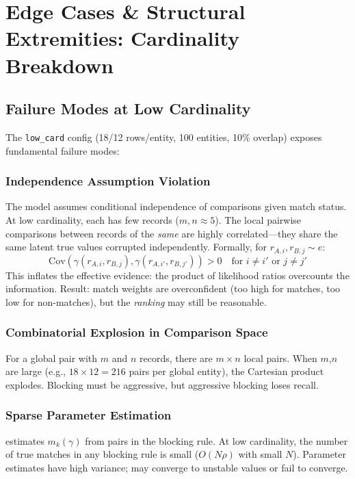\section{Edge Cases \& Structural Extremities: Cardinality Breakdown}
\label{sec:edge_cases}

\subsection{Failure Modes at Low Cardinality}
\label{sec:low_card_failure}

The \texttt{low\_card} config (18/12 rows/entity, 100 entities, 10\% overlap) exposes fundamental failure modes:

\subsubsection{Independence Assumption Violation}
The \fellegisunter{} model assumes conditional independence of comparisons given match status.
At low cardinality, each \globalentity{} has few records ($m,n \approx 5$).
The local pairwise comparisons between records of the \textit{same} \globalentity{} are highly correlated—they share the same latent true values corrupted independently.
Formally, for $r_{A,i}, r_{B,j} \sim e$:
\begin{equation}
	\text{Cov}(\gamma(r_{A,i}, r_{B,j}), \gamma(r_{A,i'}, r_{B,j'})) > 0 \quad \text{for } i \neq i' \text{ or } j \neq j'
\end{equation}
This inflates the effective evidence: the product of likelihood ratios overcounts the information.
Result: match weights are overconfident (too high for matches, too low for non-matches), but the \textit{ranking} may still be reasonable.

\subsubsection{Combinatorial Explosion in Comparison Space}
For a global pair with $m$ and $n$ records, there are $m \times n$ local pairs.
When $m$,$n$ are large (e.g., $18 \times 12 = 216$ pairs per global entity), the Cartesian product explodes.
Blocking must be aggressive, but aggressive blocking loses recall.

\subsubsection{Sparse Parameter Estimation}
\emalgo{} estimates $m_k(\gamma)$ from pairs in the blocking rule.
At low cardinality, the number of true matches in any blocking rule is small ($O(N \rho)$ with small $N$).
Parameter estimates have high variance; \emalgo{} may converge to unstable values or fail to converge.

